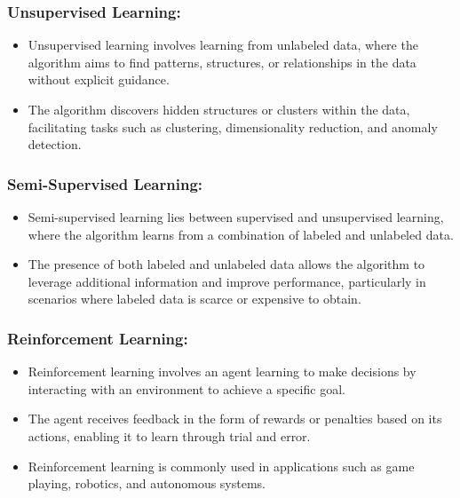\subsubsection*{Unsupervised Learning:}

\begin{itemize}
    \item{Unsupervised learning involves learning from unlabeled data, where the algorithm aims to find patterns, structures, or relationships in the data without explicit guidance.}
    \item{The algorithm discovers hidden structures or clusters within the data, facilitating tasks such as clustering, dimensionality reduction, and anomaly detection.}
\end{itemize}

\subsubsection*{Semi-Supervised Learning:}

\begin{itemize}
    \item{Semi-supervised learning lies between supervised and unsupervised learning, where the algorithm learns from a combination of labeled and unlabeled data.}
    \item{The presence of both labeled and unlabeled data allows the algorithm to leverage additional information and improve performance, particularly in scenarios where labeled data is scarce or expensive to obtain.}
\end{itemize}

\subsubsection*{Reinforcement Learning:}

\begin{itemize}
    \item{Reinforcement learning involves an agent learning to make decisions by interacting with an environment to achieve a specific goal.}
    \item{The agent receives feedback in the form of rewards or penalties based on its actions, enabling it to learn through trial and error.}
    \item{Reinforcement learning is commonly used in applications such as game playing, robotics, and autonomous systems.}
\end{itemize}

